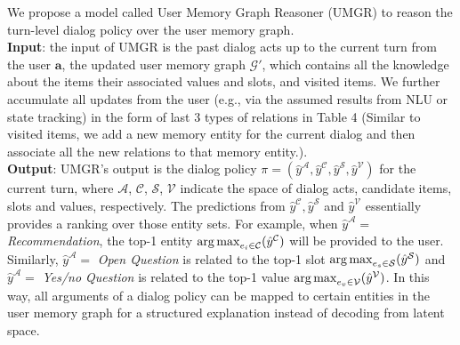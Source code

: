 We propose a model called User Memory Graph Reasoner (UMGR) to reason the turn-level dialog policy over the user memory graph.\\ 
\textbf{Input}: the input of UMGR is the past dialog acts up to the current turn from the user $\boldsymbol{a}$, the updated user memory graph $\mathcal{G}'$, which contains all the knowledge about the items their associated values and slots, and visited items. We further accumulate all updates from the user (e.g., via the assumed results from NLU or state tracking) in the form of last 3 types of relations in Table 4 (Similar to visited items, we add a new memory entity for the current dialog and then associate all the new relations to that memory entity.).\\
\textbf{Output}: UMGR's output is the dialog policy $\pi=(\hat{y}^\mathcal{A}, \hat{y}^\mathcal{C}, \hat{y}^\mathcal{S}, \hat{y}^\mathcal{V})$ for the current turn, where $\mathcal{A}$, $\mathcal{C}$, $\mathcal{S}$, $\mathcal{V}$ indicate the space of dialog acts, candidate items, slots and values, respectively.
The predictions from $\hat{y}^\mathcal{C}, \hat{y}^\mathcal{S}$ and $\hat{y}^\mathcal{V}$ essentially provides a ranking over those entity sets.
For example, when $\hat{y}^\mathcal{A}=$ \textit{Recommendation}, the top-1 entity $\operatorname*{arg\,max}_{e_i \in \mathcal{C}}(\hat{y}^\mathcal{C})$ will be provided to the user.
Similarly, $\hat{y}^\mathcal{A}=$ \textit{Open Question} is related to the top-1 slot $\operatorname*{arg\,max}_{e_s \in \mathcal{S}}(\hat{y}^\mathcal{S})$ and $\hat{y}^\mathcal{A}=$ \textit{Yes/no Question} is related to the top-1 value $\operatorname*{arg\,max}_{e_v \in \mathcal{V}}(\hat{y}^\mathcal{V})$.
In this way, all arguments of a dialog policy can be mapped to certain entities in the user memory graph for a structured explanation instead of decoding from latent space.

